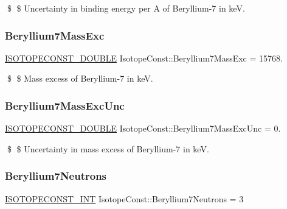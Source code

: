 \$ \$ Uncertainty in binding energy per A of Beryllium-\/7 in keV. \mbox{\label{group___isotope_const-_beryllium-_be7_ga0feb3ef6650cdb2f90a8374e54b37cda}} 
\subsubsection{\texorpdfstring{Beryllium7\+Mass\+Exc}{Beryllium7MassExc}}
{\footnotesize\ttfamily \mbox{\hyperlink{group___isotope_const-_macros_ga8f45a7272ce02c0b4c65c44636ed719a}{I\+S\+O\+T\+O\+P\+E\+C\+O\+N\+S\+T\+\_\+\+D\+O\+U\+B\+LE}} Isotope\+Const\+::\+Beryllium7\+Mass\+Exc = 15768.}

\$ \$ Mass excess of Beryllium-\/7 in keV. \mbox{\label{group___isotope_const-_beryllium-_be7_ga619464651a80e3e304e1083b8d802048}} 
\subsubsection{\texorpdfstring{Beryllium7\+Mass\+Exc\+Unc}{Beryllium7MassExcUnc}}
{\footnotesize\ttfamily \mbox{\hyperlink{group___isotope_const-_macros_ga8f45a7272ce02c0b4c65c44636ed719a}{I\+S\+O\+T\+O\+P\+E\+C\+O\+N\+S\+T\+\_\+\+D\+O\+U\+B\+LE}} Isotope\+Const\+::\+Beryllium7\+Mass\+Exc\+Unc = 0.}

\$ \$ Uncertainty in mass excess of Beryllium-\/7 in keV. \mbox{\label{group___isotope_const-_beryllium-_be7_gae3dd52090434b200a4a964110148ff34}} 
\subsubsection{\texorpdfstring{Beryllium7\+Neutrons}{Beryllium7Neutrons}}
{\footnotesize\ttfamily \mbox{\hyperlink{group___isotope_const-_macros_ga5f18360b3e99483a35c32d789e62621c}{I\+S\+O\+T\+O\+P\+E\+C\+O\+N\+S\+T\+\_\+\+I\+NT}} Isotope\+Const\+::\+Beryllium7\+Neutrons = 3}

